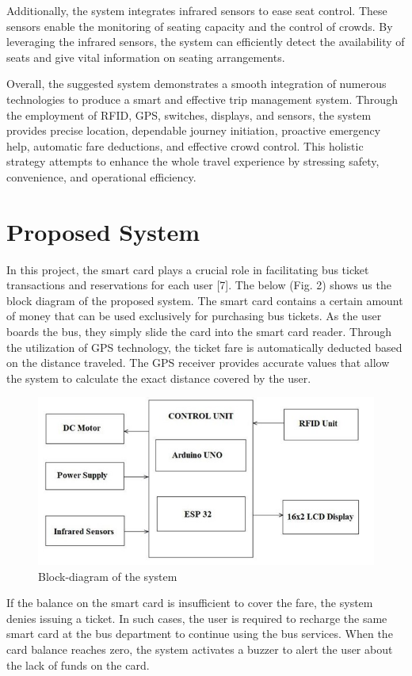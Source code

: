 \documentclass[conference]{IEEEtran}
\begin{document}
		Additionally, the system integrates infrared sensors to ease seat control. These sensors enable the monitoring of seating capacity and the control of crowds. By leveraging the infrared sensors, the system can efficiently detect the availability of seats and give vital information on seating arrangements.

		Overall, the suggested system demonstrates a smooth integration of numerous technologies to produce a smart and effective trip management system. Through the employment of RFID, GPS, switches, displays, and sensors, the system provides precise location, dependable journey initiation, proactive emergency help, automatic fare deductions, and effective crowd control. This holistic strategy attempts to enhance the whole travel experience by stressing safety, convenience, and operational efficiency.


\section{Proposed System}\label{AA}

In this project, the smart card plays a crucial role in facilitating bus ticket transactions and reservations for each user [7]. The below (Fig. 2) shows us the block diagram of the proposed system. The smart card contains a certain amount of money that can be used exclusively for purchasing bus tickets. As the user boards the bus, they simply slide the card into the smart card reader. Through the utilization of GPS technology, the ticket fare is automatically deducted based on the distance traveled. The GPS receiver provides accurate values that allow the system to calculate the exact distance covered by the user.   
\begin{figure}[htbp]
    \centering
    \includegraphics[width=0.8\linewidth]{Picture2.jpg}
    \caption{Block-diagram of the system}
    \label{fig:label_name}
  \end{figure}
  If the balance on the smart card is insufficient to cover the fare, the system denies issuing a ticket. In such cases, the user is required to recharge the same smart card at the bus department to continue using the bus services. When the card balance reaches zero, the system activates a buzzer to alert the user about the lack of funds on the card.
\end{document}
